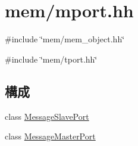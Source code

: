 \hypertarget{mport_8hh}{
\section{mem/mport.hh}
\label{mport_8hh}
}
{\ttfamily \#include \char`\"{}mem/mem\_\-object.hh\char`\"{}}\par
{\ttfamily \#include \char`\"{}mem/tport.hh\char`\"{}}\par
\subsection*{構成}
\begin{DoxyCompactItemize}
\item 
class \hyperlink{classMessageSlavePort}{MessageSlavePort}
\item 
class \hyperlink{classMessageMasterPort}{MessageMasterPort}
\end{DoxyCompactItemize}
